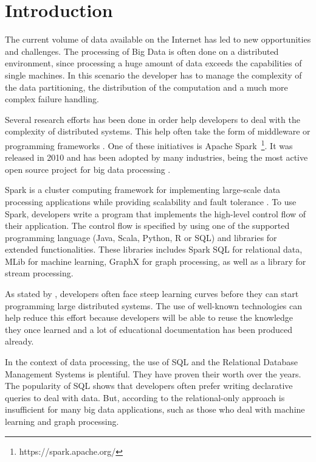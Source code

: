 \chapter{Introduction}

The current volume of data available on the Internet has led to new opportunities and challenges. The processing of Big Data is often done on a distributed environment, since processing a huge amount of data exceeds the capabilities of single machines. In this scenario the developer has to manage the complexity of the data partitioning, the distribution of the computation and a much more complex failure handling.

Several research efforts has been done in order help developers to deal with the complexity of distributed systems. This help often take the form of middleware or programming frameworks \cite{ranganathan2007complexity}. One of these initiatives is Apache Spark~\footnote{https://spark.apache.org/}. It was released in 2010 and has been adopted by many industries, being the most active open source project for big data processing \cite{armbrust2015sparksql}. 

Spark is a cluster computing framework for implementing large-scale data processing applications while providing scalability and fault tolerance \cite{zaharia2010spark}. To use Spark, developers write a program that implements the high-level control flow of their application. The control flow is specified by using one of the supported programming language (Java, Scala, Python, R or SQL) and libraries for extended functionalities. These libraries includes Spark SQL for relational data, MLib for  machine learning, GraphX for graph processing, as well as a library for stream processing.

As stated by \cite{ranganathan2007complexity}, developers often face steep learning curves before they can start programming large distributed systems. The use of well-known technologies can help reduce this effort because developers will be able to reuse the knowledge they once learned and a lot of educational documentation has been produced already.

In the context of data processing, the use of SQL and the Relational Database Management Systems is plentiful. They have proven their worth over the years. The popularity of SQL shows that developers often prefer writing declarative queries to deal with data. But, according to \cite{armbrust2015sparksql} the relational-only approach is insufficient for many big data applications, such as those who deal with machine learning and graph processing.

